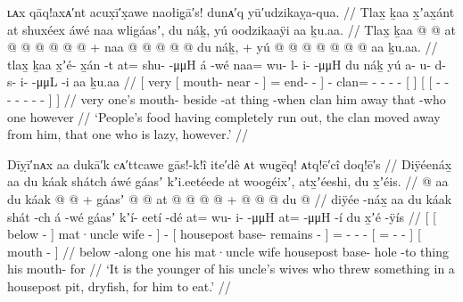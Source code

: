 \ex\label{ex:90-8-food-out-moved-away}%
%
\begingl
	\glpreamble	ʟᴀx qāq!axᴀ′nt acux̣ī′x̣awe naołig̣ā′s! dunᴀ′q yū′udzikaỵa-qua. //
	\glpreamble	Tlax̱ ḵaa x̱ʼax̱ánt at shuxéex áwé naa wligáasʼ, du náḵ, yú oodzikaaÿi aa ḵu.aa. //
	\gla	{} Tlax̱ 
			{} ḵaa  @ {} @ {} {} 
			at @  @ {} @ {} @ {} @ {} {}
		 @ {} +
		naa @  @ {} @ {} @ {} @ {}
		{} du náḵ, {} +
		{} yú
			{}  @ {} @ {} @ {} @ {} @ {} @ {} @ {} {}
			aa {} ḵu.aa. //
	\glb	{} tlax̱
			{} ḵaa x̱ʼé- x̱án -t {}
			at= shu- {}  -μμH {} {}
		á -wé
		naa= wu- l- i-  -μμH
		{} du náḵ {}
		{} yú 
			{} a- u- d- s- i-  -μμL -i {}
			aa {} ḵu.aa //
	\glc	{}[ very
			{}[  mouth- near - {}]
			= end- \·  - \· {}]
		 -
		clan= - - -  -
		{}[   {}]
		{}[ 
			{}[ - - - - -  - - {}]
			 {}]  //
	\gld	{} very
			{} one’s mouth- beside -at {}
			thing  {} {} {} -when {}
		 {}
		clan  {} {} {} {}
		{} him away {}
		{} that
			{}  {} {} {} {} {} {} -who {}
			one {} however //
	\glft	‘People’s food having completely run out, the clan moved away from him,
		that one who is lazy, however.’
		//
\endgl
\xe

\ex\label{ex:90-9-lower-wife-dryfish}%
%
\begingl
	\glpreamble	Dīỵī′nᴀx aa dukā′k cᴀ′ttcawe g̣ās!-k!î ite′dê ᴀt wug̣ēq! ᴀtq!ē′cî doq!ē′s //
	\glpreamble	Diÿéenáx̱ aa du káak shátch áwé gáasʼ kʼi.eetéede at woog̱éixʼ, atx̱ʼéeshi, du x̱ʼéis. //
	\gla	{} {}  @ {} {} aa du káak  @ {} {}
		 @ {} +
		{} gáasʼ  @ {} @ {} {}
		at @  @ {} @ {} @ {} +
		{}  @ {} @ {} @ {} {}
		{} du  @ {} {} //
	\glb	{} {} diÿée -náx̱ {} aa du káak shát -ch {}
		á -wé
		{} gáasʼ kʼí- eetí -dé {}
		at= wu- i-  -μμH
		{} at=  -μμH -í {}
		{} du x̱ʼé -ÿís {} //
	\glc	{}[ {}[ below - {}]   mat·uncle wife - {}]
		 -
		{}[ housepost base- remains - {}]
		= - -  -
		{}[ =  - - {}]
		{}[  mouth - {}] //
	\gld	{} {} below -along {} one his mat·uncle wife {} {}
		 {}
		{} housepost base- hole -to {}
		thing  {} {} {}
		{}  {} {} {} {}
		{} his mouth- for {} //
	\glft	‘It is the younger of his uncle’s wives who threw something in a housepost pit,
		dryfish, for him to eat.’
		//
\endgl
\xe

